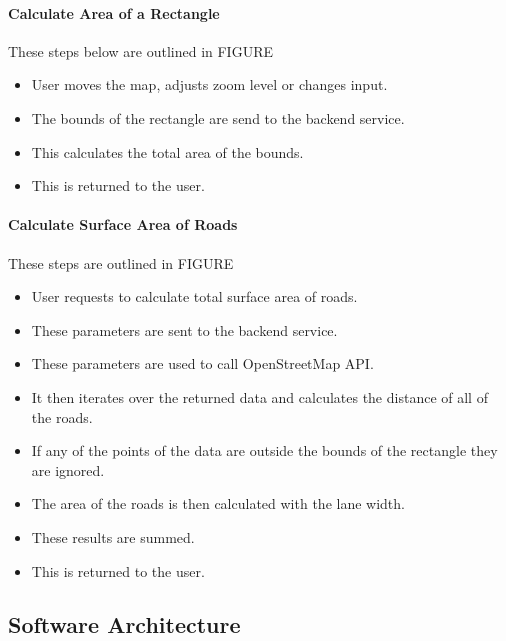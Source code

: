 \documentclass[a4paper,11pt]{article}
\begin{document}

\paragraph{Calculate Area of a Rectangle}

These steps below are outlined in FIGURE

\begin{itemize}
  \item User moves the map, adjusts zoom level or changes input.
  \item The bounds of the rectangle are send to the backend service.
  \item This calculates the total area of the bounds.
  \item This is returned to the user.
\end{itemize}

\paragraph{Calculate Surface Area of Roads}

These steps are outlined in FIGURE

\begin{itemize}
  \item User requests to calculate total surface area of roads.
  \item These parameters are sent to the backend service.
  \item These parameters are used to call OpenStreetMap API.\@
  \item It then iterates over the returned data and calculates the distance of
    all of the roads.
  \item If any of the points of the data are outside the bounds of the rectangle
    they are ignored.
  \item The area of the roads is then calculated with the lane width.
  \item These results are summed.
  \item This is returned to the user.
\end{itemize}

\subsection{Software Architecture}
\end{document}
